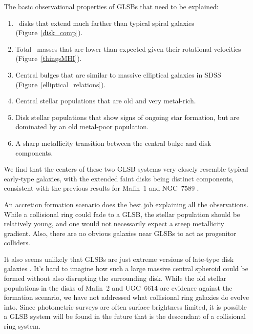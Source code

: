 \documentclass[12pt,preprint]{aastex}
\newcommand\HI{\ion{H}{1}}
\begin{document}
The basic observational properties of GLSBs that need to be explained:
\begin{enumerate}
\item{\HI\ disks that extend much farther than typical spiral galaxies (Figure~\ref{disk_comp}). }
\item{Total \HI\ masses that are lower than expected given their rotational velocities (Figure~\ref{thingsMHI}).}
\item{Central bulges that are similar to massive elliptical galaxies in SDSS (Figure~\ref{elliptical_relations}).}
\item{Central stellar populations that are old and very metal-rich.}
\item{Disk stellar populations that show signs of ongoing star formation, but are dominated by an old metal-poor population.}
\item{A sharp metallicity transition between the central bulge and disk components.}
\end{enumerate}

\begin{figure*}
\caption{Comparison of GLSB \HI\ masses \citep{Pickering97} with \HI\ masses measured in the THINGS survey \citep{Walter2008}.
While the \HI\ masses in the GLSB systems are high, they are consistent with what would be available in a merger with a V$_{\rm{max}}\sim$110 km/s or smaller galaxy, assuming the merger did not trigger large amounts of star formation and feedback. \label{thingsMHI}}
\end{figure*}


We find that the centers of these two GLSB systems very closely resemble typical early-type galaxies, with the extended faint disks being distinct components, consistent with the previous results for Malin~1 \citep{Barth07} and NGC~7589 \citep{Lelli10}. 

An accretion formation scenario does the best job explaining all the observations.
While a collisional ring could fade to a GLSB, the stellar population should be relatively young, and one would not necessarily expect a steep metallicity gradient.
Also, there are no obvious galaxies near GLSBs to act as progenitor colliders.


It also seems unlikely that GLSBs are just extreme versions of late-type disk galaxies \citep{Das13}.
It's hard to imagine how such a large massive central spheroid could be formed without also disrupting the surrounding disk.
While the old stellar populations in the disks of Malin~2 and UGC~6614 are evidence against the \citet{Mapelli08} formation scenario, we have not addressed what collisional ring galaxies do evolve into.
Since photometric surveys are often surface brightness limited, it is possible a GLSB system will be found in the future that is the descendant of a collisional ring system.
\end{document}
